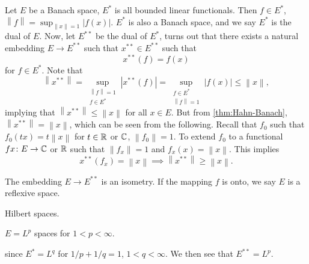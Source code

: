 Let \(E\) be a Banach space, \(E^{\ast} \) is all bounded linear functionals. Then \(f\in E^{\ast} \), \(\left\lVert f\right\rVert = \sup _{\left\lVert x\right\rVert = 1}\left\vert f(x) \right\vert \). \(E^{\ast} \) is also a Banach space, and we say \(E^{\ast} \) is the dual of \(E\). Now, let \(E^{\ast\ast} \) be the dual of \(E^{\ast} \), turns out that there exists a natural embedding \(E\to E^{\ast\ast}\) such that \(x^{\ast\ast}\in E^{\ast\ast} \) such that
\[
	x^{\ast\ast} (f) = f(x)
\]
for \(f\in E^{\ast} \). Note that
\[
	\left\lVert x^{\ast\ast} \right\rVert = \sup _{\substack{\left\lVert f\right\rVert = 1\\ f\in E^{\ast} }}\left\vert x^{\ast\ast} (f) \right\vert = \sup _{\substack{f\in E^{\ast}\\ \left\lVert f\right\rVert = 1}} \left\vert f(x) \right\vert  \leq \left\lVert x\right\rVert,
\]
implying that \(\left\lVert x^{\ast\ast} \right\rVert \leq \left\lVert x\right\rVert \) for all \(x\in E\). But from \autoref{thm:Hahn-Banach}, \(\left\lVert x^{\ast\ast} \right\rVert = \left\lVert x\right\rVert \), which can be seen from the following. Recall that \(f_0\) such that \(f_0(tx) = t\left\lVert x\right\rVert \) for \(t\in \mathbb{\MakeUppercase{r}} \) or \(\mathbb{\MakeUppercase{c}} \), \(\left\lVert f_0\right\rVert = 1\). To extend \(f_0\) to a functional \(fx \colon E\to \mathbb{\MakeUppercase{c}} \) or \(\mathbb{\MakeUppercase{r}} \) such that \(\left\lVert f_x\right\rVert = 1\) and \(f_x(x) = \left\lVert x\right\rVert \). This implies
\[
	x^{\ast\ast} (f_x) = \left\lVert x\right\rVert \implies \left\lVert x^{\ast\ast} \right\rVert \geq \left\lVert x\right\rVert.
\]

\begin{remark}
	The embedding \(E \to E^{\ast\ast} \) is an isometry. If the mapping \(f\) is onto, we say \(E\) is a reflexive space.
\end{remark}

\begin{eg}
	Hilbert spaces.
\end{eg}

\begin{eg}
	\(E = L^p\) spaces for \(1 < p < \infty \).
\end{eg}
\begin{explanation}
	since \(E^{\ast} = L^q\) for \(1 / p + 1 / q = 1\), \(1 < q < \infty \). We then see that \(E^{\ast\ast} = L^p\).
\end{explanation}

